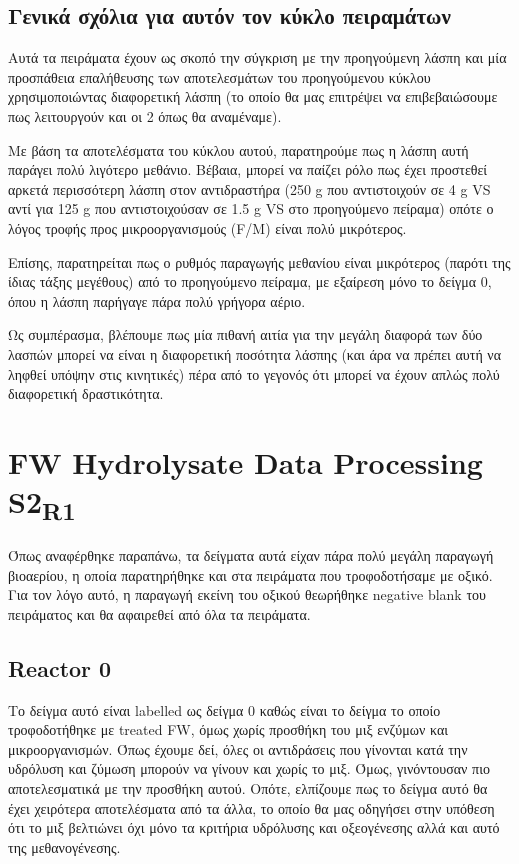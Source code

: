 \documentclass[11pt]{article}
\begin{document}
\subsection{Γενικά σχόλια για αυτόν τον κύκλο πειραμάτων}
\label{sec:orge197440}
Αυτά τα πειράματα έχουν ως σκοπό την σύγκριση με την προηγούμενη λάσπη και μία προσπάθεια επαλήθευσης των αποτελεσμάτων του προηγούμενου κύκλου χρησιμοποιώντας διαφορετική λάσπη (το οποίο θα μας επιτρέψει να επιβεβαιώσουμε πως λειτουργούν και οι 2 όπως θα αναμέναμε).

Με βάση τα αποτελέσματα του κύκλου αυτού, παρατηρούμε πως η λάσπη αυτή παράγει πολύ λιγότερο μεθάνιο. Βέβαια, μπορεί να παίζει ρόλο πως έχει προστεθεί αρκετά περισσότερη λάσπη στον αντιδραστήρα (250 g που αντιστοιχούν σε 4 g VS αντί για 125 g που αντιστοιχούσαν σε 1.5 g VS στο προηγούμενο πείραμα) οπότε ο λόγος τροφής προς μικροοργανισμούς (F/M) είναι πολύ μικρότερος.

Επίσης, παρατηρείται πως ο ρυθμός παραγωγής μεθανίου είναι μικρότερος (παρότι της ίδιας τάξης μεγέθους) από το προηγούμενο πείραμα, με εξαίρεση μόνο το δείγμα 0, όπου η λάσπη παρήγαγε πάρα πολύ γρήγορα αέριο.

Ως συμπέρασμα, βλέπουμε πως μία πιθανή αιτία για την μεγάλη διαφορά των δύο λασπών μπορεί να είναι η διαφορετική ποσότητα λάσπης (και άρα να πρέπει αυτή να ληφθεί υπόψην στις κινητικές) πέρα από το γεγονός ότι μπορεί να έχουν απλώς πολύ διαφορετική δραστικότητα.

\section{FW Hydrolysate Data Processing S2\textsubscript{R1}}
\label{sec:org80f385a}
Όπως αναφέρθηκε παραπάνω, τα δείγματα αυτά είχαν πάρα πολύ μεγάλη παραγωγή βιοαερίου, η οποία παρατηρήθηκε και στα πειράματα που τροφοδοτήσαμε με οξικό. Για τον λόγο αυτό, η παραγωγή εκείνη του οξικού θεωρήθηκε negative blank του πειράματος και θα αφαιρεθεί από όλα τα πειράματα.

\subsection{Reactor 0}
\label{sec:org815eaba}
Το δείγμα αυτό είναι labelled ως δείγμα 0 καθώς είναι το δείγμα το οποίο τροφοδοτήθηκε με treated FW, όμως χωρίς προσθήκη του μιξ ενζύμων και μικροοργανισμών. Όπως έχουμε δεί, όλες οι αντιδράσεις που γίνονται κατά την υδρόλυση και ζύμωση μπορούν να γίνουν και χωρίς το μιξ. Όμως, γινόντουσαν πιο αποτελεσματικά με την προσθήκη αυτού. Οπότε, ελπίζουμε πως το δείγμα αυτό θα έχει χειρότερα αποτελέσματα από τα άλλα, το οποίο θα μας οδηγήσει στην υπόθεση ότι το μιξ βελτιώνει όχι μόνο τα κριτήρια υδρόλυσης και οξεογένεσης αλλά και αυτό της μεθανογένεσης.
\end{document}
